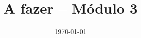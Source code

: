 \documentclass[12pt,a4paper]{article}
\title{A fazer -- Módulo 3}
\author{}
\date{\today}
\newcommand{\cmark}{\ding{51}}%
\newcommand{\done}{\rlap{$\square$}{\raisebox{2pt}{\large\hspace{1pt}\cmark}}%
\hspace{-2.5pt}}
\begin{document}
\maketitle

\begin{todolist}
    \item 

\end{todolist}
\end{document}
